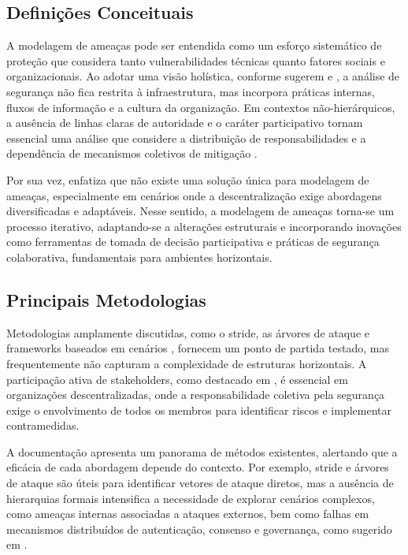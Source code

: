 \subsection{Definições Conceituais} 
\label{sec:definicoes_conceituais}

A modelagem de ameaças pode ser entendida como um esforço sistemático de
proteção que considera tanto vulnerabilidades técnicas quanto fatores
sociais e organizacionais. Ao adotar uma visão holística, conforme sugerem
\cite{ThreatModelingAsABasisForSecurityRequirements} e
\cite{AdvancedThreatModeling}, a análise de segurança não fica restrita à
infraestrutura, mas incorpora práticas internas, fluxos de informação e a
cultura da organização. Em contextos não-hierárquicos, a ausência de linhas
claras de autoridade e o caráter participativo tornam essencial uma análise
que considere a distribuição de responsabilidades e a dependência de
mecanismos coletivos de mitigação \cite{Colbac}.

Por sua vez, \cite{DemystifyingTheThreatModelingProcess} enfatiza que não
existe uma solução única para modelagem de ameaças, especialmente em
cenários onde a descentralização exige abordagens diversificadas e
adaptáveis. Nesse sentido, a modelagem de ameaças torna-se um processo
iterativo, adaptando-se a alterações estruturais e incorporando inovações
como ferramentas de tomada de decisão participativa e práticas de segurança
colaborativa, fundamentais para ambientes horizontais.


\subsection{Principais Metodologias}
\label{sec:principais_metodologias}

Metodologias amplamente discutidas, como o \gls{stride}, as árvores de
ataque e frameworks baseados em cenários
\cite{EvaluationofCompetingThreatModeling}, fornecem um ponto de partida
testado, mas frequentemente não capturam a complexidade de estruturas
horizontais. A participação ativa de stakeholders, como destacado em
\cite{ParticipatoryThreatModelling}, é essencial em organizações
descentralizadas, onde a responsabilidade coletiva pela segurança exige o
envolvimento de todos os membros para identificar riscos e implementar
contramedidas.

A documentação \cite{ThreatModelingASummaryOfAvailableMethods} apresenta um
panorama de métodos existentes, alertando que a eficácia de cada abordagem
depende do contexto. Por exemplo, \gls{stride} e árvores de ataque são
úteis para identificar vetores de ataque diretos, mas a ausência de
hierarquias formais intensifica a necessidade de explorar cenários
complexos, como ameaças internas associadas a ataques externos, bem como
falhas em mecanismos distribuídos de autenticação, consenso e governança,
como sugerido em \cite{Colbac}.

